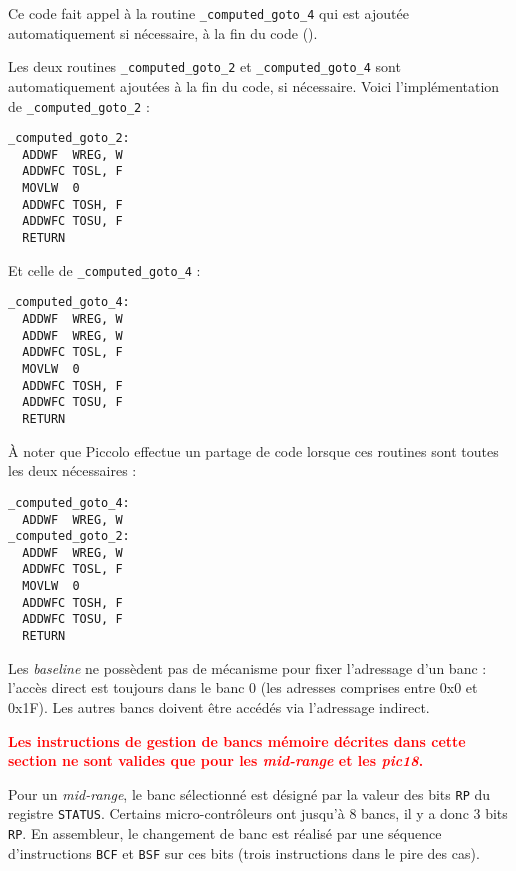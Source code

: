 Ce code fait appel à la routine \texttt{\_computed\_goto\_4} qui est ajoutée automatiquement si nécessaire, à la fin du code (). 





Les deux routines \texttt{\_computed\_goto\_2} et \texttt{\_computed\_goto\_4} sont automatiquement ajoutées à la fin du code, si nécessaire. Voici l'implémentation de \texttt{\_computed\_goto\_2} :
\begin{lstlisting}[language=assembleur]
_computed_goto_2:
  ADDWF  WREG, W
  ADDWFC TOSL, F
  MOVLW  0
  ADDWFC TOSH, F
  ADDWFC TOSU, F
  RETURN
\end{lstlisting}

Et celle de \texttt{\_computed\_goto\_4} :
\begin{lstlisting}[language=assembleur]
_computed_goto_4:
  ADDWF  WREG, W
  ADDWF  WREG, W
  ADDWFC TOSL, F
  MOVLW  0
  ADDWFC TOSH, F
  ADDWFC TOSU, F
  RETURN
\end{lstlisting}

À noter que Piccolo effectue un partage de code lorsque ces routines sont toutes les deux nécessaires :
\begin{lstlisting}[language=assembleur]
_computed_goto_4:
  ADDWF  WREG, W
_computed_goto_2:
  ADDWF  WREG, W
  ADDWFC TOSL, F
  MOVLW  0
  ADDWFC TOSH, F
  ADDWFC TOSU, F
  RETURN
\end{lstlisting}













Les \emph{baseline} ne possèdent pas de mécanisme pour fixer l'adressage d'un banc : l'accès direct est toujours dans le banc 0 (les adresses comprises entre 0x0 et 0x1F). Les autres bancs doivent être accédés via l'adressage indirect.

\textcolor{red}{\bf Les instructions de gestion de bancs mémoire décrites dans cette section ne sont valides que pour les \emph{mid-range} et les \emph{pic18}.}

Pour un \emph{mid-range}, le banc sélectionné est désigné par la valeur des bits \texttt{RP} du registre \texttt{STATUS}. Certains micro-contrôleurs ont jusqu'à 8 bancs, il y a donc 3 bits \texttt{RP}. En assembleur, le changement de banc est réalisé par une séquence d'instructions \texttt{BCF} et \texttt{BSF} sur ces bits (trois instructions dans le pire des cas). 


